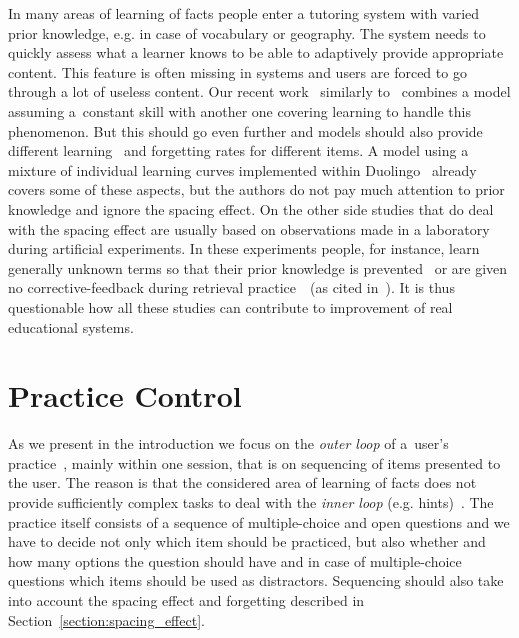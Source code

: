 \documentclass[table,color,cover,twoside,nolot,nolof]{fithesis3/fithesis3}
\begin{document}
\noindent
In many areas of learning of facts people enter a tutoring system
with varied prior knowledge, e.g. in case of vocabulary or geography. The
system needs to quickly assess what a learner knows to be able to adaptively
provide appropriate content. This feature is often missing in systems
and users are forced to go through a lot of useless content. Our recent
work~\cite{papousek2014adaptive} similarly to~\cite{khajah2014integrating}
combines a model assuming a~constant skill with another one covering learning
to handle this phenomenon. But this should go even further and models should
also provide different learning~\cite{pelanek2015modeling} and forgetting rates
for different items. A model using a mixture of individual learning curves
implemented within Duolingo~\cite{streeter2015mixture} already covers some of
these aspects, but the authors do not pay much attention to prior knowledge and
ignore the spacing effect. On the other side studies that do deal with the
spacing effect are usually based on observations made in a laboratory during
artificial experiments. In these experiments people, for instance, learn
generally unknown terms so that their prior knowledge is
prevented~\cite{kang2014retrieval} or are given no corrective-feedback
during retrieval practice~\cite{landauer1978optimum}~(as cited
in~\cite{kang2014retrieval}). It is thus questionable how all these studies can
contribute to improvement of real educational systems.

\section{Practice Control}
\label{section:practice_control}

As we present in the introduction we focus on the \emph{outer loop}
of a~user's practice~\cite{vanlehn2006behavior}, mainly within one session, that
is on sequencing of items presented to the user. The reason is that the
considered area of learning of facts does not provide sufficiently complex
tasks to deal with the \emph{inner loop} (e.g.
hints)~\cite{vanlehn2006behavior}. The practice itself consists of a sequence
of multiple-choice and open questions and we have to decide not only which item
should be practiced, but also whether and how many options the question should
have and in case of multiple-choice questions which items should be used as
distractors. Sequencing should also take into account the spacing effect and
forgetting described in Section~\ref{section:spacing_effect}.
\end{document}
